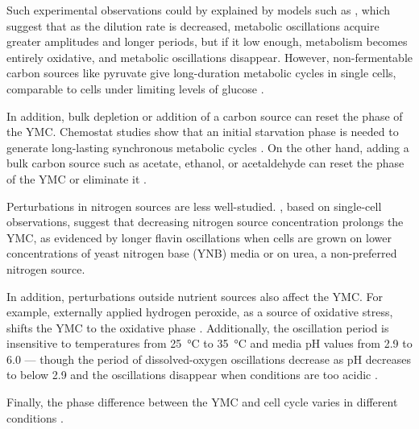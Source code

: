 Such experimental observations could by explained by models such as \textcite{jonesCyberneticModelGrowth1999}, which suggest that as the dilution rate is decreased, metabolic oscillations acquire greater amplitudes and longer periods, but if it low enough, metabolism becomes entirely oxidative, and metabolic oscillations disappear.
However, non-fermentable carbon sources like pyruvate give long-duration metabolic cycles in single cells, comparable to cells under limiting levels of glucose \parencite{papagiannakisAutonomousMetabolicOscillations2017}.

In addition, bulk depletion or addition of a carbon source can reset the phase of the YMC.
Chemostat studies show that an initial starvation phase is needed to generate long-lasting synchronous metabolic cycles \parencite{tuLogicYeastMetabolic2005}. %
On the other hand, adding a bulk carbon source such as acetate, ethanol, or acetaldehyde can reset the phase of the YMC \citep{kuangMsn2RegulateExpression2017, krishnaMinimalPushPull2018} or eliminate it \citep{jonesCyberneticModelGrowth1999}.

Perturbations in nitrogen sources are less well-studied.
\textcite{baumgartnerFlavinbasedMetabolicCycles2018}, based on single-cell observations, suggest that decreasing nitrogen source concentration prolongs the YMC, as evidenced by longer flavin oscillations when cells are grown on lower concentrations of yeast nitrogen base (YNB) media or on urea, a non-preferred nitrogen source.

In addition, perturbations outside nutrient sources also affect the YMC.
For example, externally applied hydrogen peroxide, as a source of oxidative stress, shifts the YMC to the oxidative phase \citep{amponsahPeroxiredoxinsCoupleMetabolism2021}.
Additionally, the oscillation period is insensitive to temperatures from \SI{25}{\celsius} to \SI{35}{\celsius} and media pH values from
2.9 to 6.0 \citep{lloydUltradianMetronomeTimekeeper2005} --- though the period of dissolved-oxygen oscillations decrease as pH decreases to below 2.9 and the oscillations disappear when conditions are too acidic \citep{oneillEukaryoticCellBiology2020}.

Finally, the phase difference between the YMC and cell cycle varies in different conditions %
\citep{ewaldYeastCyclinDependentKinase2016}. %

